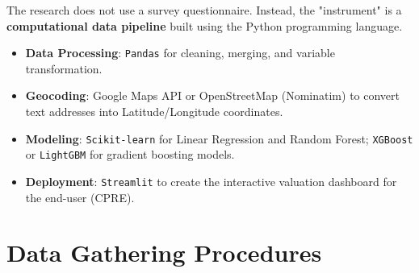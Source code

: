 The research does not use a survey questionnaire. Instead, the "instrument" is a \textbf{computational data pipeline} built using the Python programming language.

\begin{itemize}
    \item \textbf{Data Processing}: \texttt{Pandas} for cleaning, merging, and variable transformation.
    \item \textbf{Geocoding}: Google Maps API or OpenStreetMap (Nominatim) to convert text addresses into Latitude/Longitude coordinates.
    \item \textbf{Modeling}: \texttt{Scikit-learn} for Linear Regression and Random Forest; \texttt{XGBoost} or \texttt{LightGBM} for gradient boosting models.
    \item \textbf{Deployment}: \texttt{Streamlit} to create the interactive valuation dashboard for the end-user (CPRE).
\end{itemize}

\section{Data Gathering Procedures}

